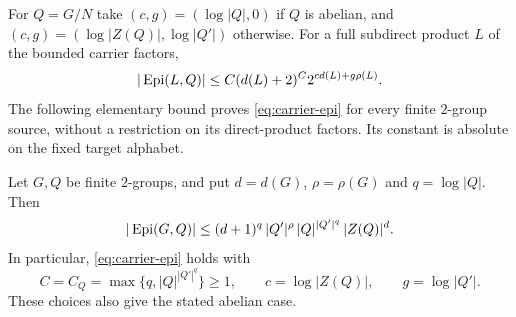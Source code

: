 For $Q=G/N$ take $(c,g)=(\log|Q|,0)$ if $Q$ is abelian, and
$(c,g)=(\log|Z(Q)|,\log|Q'|)$ otherwise. For a full subdirect
product $L$ of the bounded carrier factors,
\begin{equation}\label{eq:carrier-epi}
 |\operatorname{Epi}(L,Q)|\leq C(d(L)+2)^C2^{c d(L)+g\rho(L)}.
\end{equation}
The following elementary bound proves \eqref{eq:carrier-epi} for every
finite $2$-group source, without a restriction on its direct-product
factors. Its constant is absolute on the fixed target alphabet.

\begin{proposition}\label{prop:structured-epi}
Let $G,Q$ be finite $2$-groups, and put $d=d(G)$,
$\rho=\rho(G)$ and $q=\log|Q|$. Then
\begin{equation}\label{eq:structured-epi-explicit}
 |\operatorname{Epi}(G,Q)|\leq
 (d+1)^q\,|Q'|^{\rho}\,|Q|^{|Q'|^q}\,|Z(Q)|^d.
\end{equation}
In particular, \eqref{eq:carrier-epi} holds with
\[
 C=C_Q=\max\{q,|Q|^{|Q'|^q}\}\geq1,\qquad
 c=\log|Z(Q)|,\qquad g=\log|Q'|.
\]
These choices also give the stated abelian case.
\end{proposition}
